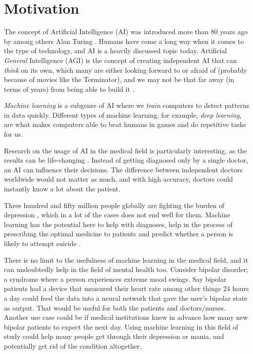 \section{Motivation}

The concept of Artificial Intelligence (AI) was introduced more than 80 years ago by among others Alan Turing \cite{turing1938}. Humans have come a long way when it comes to the type of technology, and AI is a heavily discussed topic today. Artificial \textit{General} Intelligence (AGI) is the concept of creating independent AI that can \textit{think} on its own, which many are either looking forward to or afraid of (probably because of movies like the Terminator), and we may not be that far away (in terms of years) from being able to build it \cite{peter_morgan_2019}. 

\textit{Machine learning} is a subgenre of AI where we \textit{train} computers to detect patterns in data quickly. Different types of machine learning, for example, \textit{deep learning}, are what makes computers able to beat humans in games and do repetitive tasks for us. 

Research on the usage of AI in the medical field is particularly interesting, as the results can be life-changing \cite{topol2019}. Instead of getting diagnosed only by a single doctor, an AI can influence their decisions. The difference between independent doctors worldwide would not matter as much, and with high accuracy, doctors could instantly know a lot about the patient. 

Three hundred and fifty million people globally are fighting the burden of depression \cite{burden_of_depression}, which in a lot of the cases does not end well for them. Machine learning has the potential here to help with diagnoses, help in the process of prescribing the optimal medicine to patients and predict whether a person is likely to attempt suicide \cite{topol2019}. 

There is no limit to the usefulness of machine learning in the medical field, and it can undoubtedly help in the field of mental health too. Consider bipolar disorder; a syndrome where a person experiences extreme mood swings. Say bipolar patients had a device that measured their heart rate among other things 24 hours a day could feed the data into a neural network that gave the user's bipolar state as output. That would be useful for both the patients and doctors/nurses. Another use case could be if medical institutions knew in advance how many new bipolar patients to expect the next day. Using machine learning in this field of study could help many people get through their depression or mania, and potentially get rid of the condition altogether.

